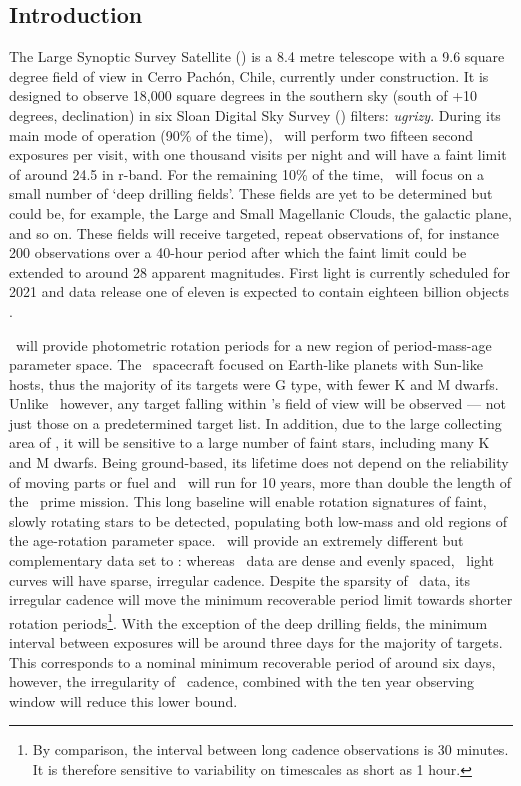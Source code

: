 \subsection{Introduction}

The Large Synoptic Survey Satellite (\LSST) is a 8.4 metre telescope with a
9.6 square degree field of view in Cerro Pach\'{o}n, Chile, currently under
construction.
It is designed to observe 18,000 square degrees in the southern sky (south of
+10 degrees, declination) in six Sloan Digital Sky Survey (\SDSS) filters:
{\it ugrizy}.
During its main mode of operation (90\% of the time), \LSST\ will perform two
fifteen second exposures per visit, with one thousand visits per night and
will have a faint limit of around 24.5 in r-band.
For the remaining 10\% of the time, \LSST\ will focus on a small number of
`deep drilling fields'.
These fields are yet to be determined but could be, for example, the Large and
Small Magellanic Clouds, the galactic plane, and so on.
These fields will receive targeted, repeat observations of, for instance 200
observations over a 40-hour period after which the faint limit could be
extended to around 28 apparent magnitudes.
First light is currently scheduled for 2021 and data release one of eleven is
expected to contain eighteen billion objects \citep{Ivezic2008}.

\LSST\ will provide photometric rotation periods for a new region of
period-mass-age parameter space.
The \kepler\ spacecraft focused on Earth-like planets with Sun-like hosts,
thus the majority of its targets were G type, with fewer K and M dwarfs.
Unlike \kepler\ however, any target falling within \LSST's field of view will
be observed --- not just those on a predetermined target list.
In addition, due to the large collecting area of \LSST, it will be sensitive
to a large number of faint stars, including many K and M dwarfs.
Being ground-based, its lifetime does not depend on the reliability of moving
parts or fuel and \LSST\ will run for 10 years, more than double the length of
the \kepler\ prime mission.
This long baseline will enable rotation signatures of faint, slowly rotating
stars to be detected, populating both low-mass and old regions of the
age-rotation parameter space.
\LSST\ will provide an extremely different but complementary data set to
\kepler: whereas \kepler\ data are dense and evenly spaced, \LSST\ light
curves will have sparse, irregular cadence.
Despite the sparsity of \LSST\ data, its irregular cadence will move the
minimum recoverable period limit towards shorter rotation periods\footnote{By
comparison, the interval between \kepler long cadence observations is 30
minutes. It is therefore sensitive to variability on timescales as short as
1 hour.}.
With the exception of the deep drilling fields, the minimum interval
between exposures will be around three days for the majority of targets.
This corresponds to a nominal minimum recoverable period of around six days,
however, the irregularity of \LSST\ cadence, combined with the ten year
observing window will reduce this lower bound.

